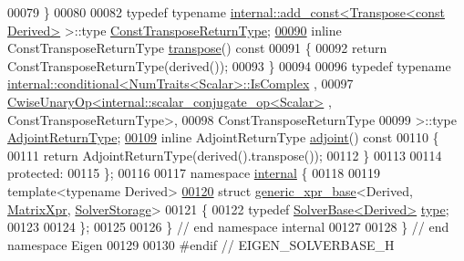 \begin{DoxyCode}
00079     \}
00080 
00082     \textcolor{keyword}{typedef} \textcolor{keyword}{typename} \hyperlink{struct_eigen_1_1internal_1_1add__const}{internal::add\_const<Transpose<const Derived>}
       >::type \hyperlink{group___core___module_class_eigen_1_1_transpose}{ConstTransposeReturnType};
\hyperlink{class_eigen_1_1_solver_base_a732e75b5132bb4db3775916927b0e86c}{00090}     \textcolor{keyword}{inline} ConstTransposeReturnType \hyperlink{class_eigen_1_1_solver_base_a732e75b5132bb4db3775916927b0e86c}{transpose}()\textcolor{keyword}{ const}
00091 \textcolor{keyword}{    }\{
00092       \textcolor{keywordflow}{return} ConstTransposeReturnType(derived());
00093     \}
00094 
00096     \textcolor{keyword}{typedef} \textcolor{keyword}{typename} \hyperlink{struct_eigen_1_1internal_1_1conditional}{internal::conditional<NumTraits<Scalar>::IsComplex}
      ,
00097                         \hyperlink{group___core___module_class_eigen_1_1_cwise_unary_op}{CwiseUnaryOp<internal::scalar\_conjugate\_op<Scalar>}
      , ConstTransposeReturnType>,
00098                         ConstTransposeReturnType
00099                      >::type \hyperlink{class_eigen_1_1internal_1_1_tensor_lazy_evaluator_writable}{AdjointReturnType};
\hyperlink{class_eigen_1_1_solver_base_a05a3686a89888681c8e0c2bcab6d1ce5}{00109}     \textcolor{keyword}{inline} AdjointReturnType \hyperlink{class_eigen_1_1_solver_base_a05a3686a89888681c8e0c2bcab6d1ce5}{adjoint}()\textcolor{keyword}{ const}
00110 \textcolor{keyword}{    }\{
00111       \textcolor{keywordflow}{return} AdjointReturnType(derived().transpose());
00112     \}
00113 
00114   \textcolor{keyword}{protected}:
00115 \};
00116 
00117 \textcolor{keyword}{namespace }\hyperlink{namespaceinternal}{internal} \{
00118 
00119 \textcolor{keyword}{template}<\textcolor{keyword}{typename} Derived>
\hyperlink{struct_eigen_1_1internal_1_1generic__xpr__base_3_01_derived_00_01_matrix_xpr_00_01_solver_storage_01_4}{00120} \textcolor{keyword}{struct }\hyperlink{struct_eigen_1_1internal_1_1generic__xpr__base}{generic\_xpr\_base}<Derived, \hyperlink{struct_eigen_1_1_matrix_xpr}{MatrixXpr}, 
      \hyperlink{struct_eigen_1_1_solver_storage}{SolverStorage}>
00121 \{
00122   \textcolor{keyword}{typedef} \hyperlink{class_eigen_1_1_solver_base}{SolverBase<Derived>} \hyperlink{class_eigen_1_1_solver_base}{type};
00123 
00124 \};
00125 
00126 \} \textcolor{comment}{// end namespace internal}
00127 
00128 \} \textcolor{comment}{// end namespace Eigen}
00129 
00130 \textcolor{preprocessor}{#endif // EIGEN\_SOLVERBASE\_H}
\end{DoxyCode}
